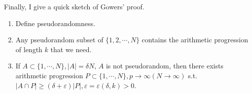 \documentclass[12pt]{article}
\begin{document}
Finally, I give a quick sketch of Gowers' proof.
\begin{enumerate}
	\item Define pseudorandomness.
	\item Any pseudorandom subset of $\{1,2,\cdots,N \}$ contains the arithmetic progression of length $k$ that we need.
	\item If $A\subset\{1,\cdots,N \},|A|=\delta N$, $A$ is not pseudorandom, then there exists arithmetic progression $P\subset\{1,\cdots,N \},p\to\infty(N\to\infty)$ s.t. $|A\cap P|\ge (\delta+\varepsilon)|P|, \varepsilon=\varepsilon(\delta, k)>0$.
\end{enumerate}




\end{document}

